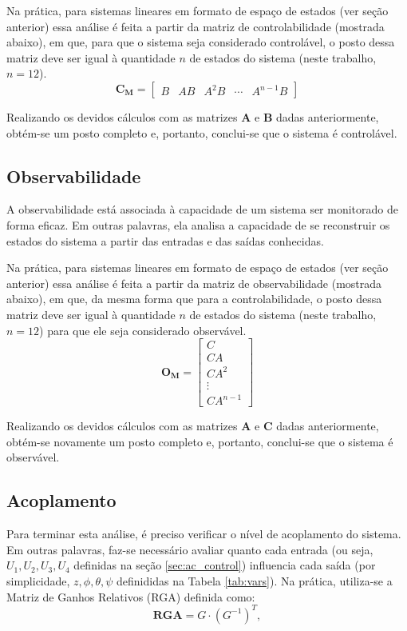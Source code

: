 Na prática, para sistemas lineares em formato de espaço de estados (ver seção anterior) essa análise é feita a 
partir da matriz de controlabilidade (mostrada abaixo), em que, para que o sistema 
seja considerado controlável, o posto dessa matriz deve ser igual à quantidade $n$ de estados do sistema (neste trabalho, 
$n=12$).
\begin{equation*}
    \mathbf{C_M} = \begin{bmatrix}
    B & AB & A^2B & \cdots & A^{n-1}B
    \end{bmatrix}
\end{equation*}

Realizando os devidos cálculos com as matrizes $\mathbf{A}$ e $\mathbf{B}$ dadas anteriormente, obtém-se um posto 
completo e, portanto, conclui-se que o sistema é controlável.

\subsection{Observabilidade}
A observabilidade está associada à capacidade de um sistema ser monitorado de forma eficaz. Em outras palavras, ela 
analisa a capacidade de se reconstruir os estados do sistema a partir das entradas e das saídas conhecidas.

Na prática, para sistemas lineares em formato de espaço de estados (ver seção anterior) essa análise é feita a 
partir da matriz de observabilidade (mostrada abaixo), em que, da mesma forma que para a controlabilidade, 
o posto dessa matriz deve ser igual à quantidade $n$ de estados do sistema (neste trabalho, 
$n=12$) para que ele seja considerado observável.
\begin{equation*}
    \mathbf{O_M} = \begin{bmatrix}
    C \\
    CA \\
    CA^2 \\
    \vdots \\
    CA^{n-1}
    \end{bmatrix}
\end{equation*}

Realizando os devidos cálculos com as matrizes $\mathbf{A}$ e $\mathbf{C}$ dadas anteriormente, obtém-se novamente 
um posto completo e, portanto, conclui-se que o sistema é observável.

\subsection{Acoplamento}
Para terminar esta análise, é preciso verificar o nível de acoplamento do sistema. Em outras palavras, 
faz-se necessário avaliar quanto cada entrada (ou seja, $U_1, U_2, U_3, U_4$ definidas na seção 
\ref{sec:ac_control}) influencia cada saída (por simplicidade, $z, \phi, \theta, \psi$ definididas na 
Tabela \ref{tab:vars}). Na prática, utiliza-se a Matriz de Ganhos Relativos (RGA) definida como:
\begin{equation*}
    \mathbf{RGA} = G \cdot {(G^{-1})}^T,
\end{equation*}

